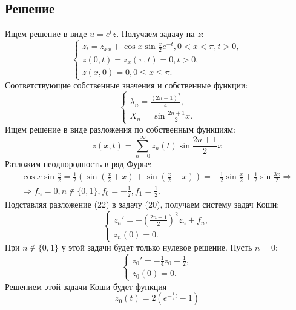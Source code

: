 \documentclass[11pt]{article}
\begin{document}
\subsection{Решение}
\label{sec:org1d0f56b}
Ищем решение в виде $u = e^tz$. Получаем задачу на $z$:
\begin{equation}
\begin{cases}
z_t = z_{xx} + \cos x\sin\frac{x}2e^{-t}, 0 < x < \pi, t > 0, \\
z(0, t) = z_x(\pi, t) = 0, t > 0, \\
z(x, 0) = 0, 0 \leq x \leq \pi.
\end{cases}
\end{equation}
Соответствующие собственные значения и собственные функции:
\begin{equation}
\begin{cases}
\lambda_n = \frac{(2n + 1)^2}4, \\
X_n = \sin\frac{2n + 1}2x.
\end{cases}
\end{equation}
Ищем решение в виде разложения по собственным функциям:
\begin{equation}
z(x, t) = \sum_{n = 0}^{\infty}z_n(t)\sin\frac{2n + 1}2x
\end{equation}
Разложим неоднородность в ряд Фурье:
\begin{multline*}
\cos x\sin\frac{x}2 = \frac12\left(\sin\left(\frac{x}2 + x\right) + \sin\left(\frac{x}2 - x\right)\right)
= -\frac12\sin\frac{x}2 + \frac12\sin\frac{3x}2 \Rightarrow \\
\Rightarrow f_n = 0, n \notin \{0, 1\}, f_0 = -\frac12, f_1 = \frac12.
\end{multline*}
Подставляя разложение (22) в задачу (20), получаем систему задач Коши:
\begin{equation}
\begin{cases}
z_n' = -\left(\frac{2n + 1}2\right)^2z_n + f_n, \\
z_n(0) = 0.
\end{cases}
\end{equation}
При $n \notin \{0, 1\}$ у этой задачи будет только нулевое решение. Пусть $n = 0$:
\begin{equation*}
\begin{cases}
z_0' = -\frac14z_0 - \frac12, \\
z_0(0) = 0.
\end{cases}
\end{equation*}
Решением этой задачи Коши будет функция
\begin{equation}
z_0(t) = 2(e^{-\frac14t} - 1)
\end{equation}
\end{document}
